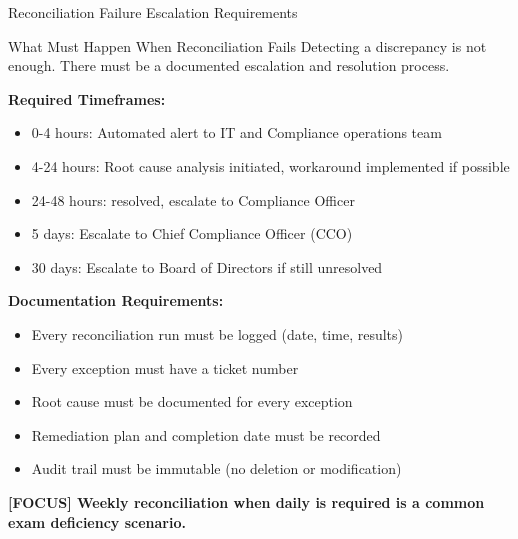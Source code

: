 \documentclass[11pt,a4paper]{beamer}
\newcommand{\examfocus}[1]{\textcolor{orange!80!black}{\textbf{[FOCUS] #1}}}
\begin{document}
	\begin{frame}{Reconciliation Failure Escalation Requirements}
		\begin{block}{What Must Happen When Reconciliation Fails}
			Detecting a discrepancy is not enough. There must be a documented escalation and resolution process.
		\end{block}
		
		\textbf{Required Timeframes:}
		\begin{itemize}
			\item 0-4 hours: Automated alert to IT and Compliance operations team
			\item 4-24 hours: Root cause analysis initiated, workaround implemented if possible
			\item 24-48 hours:  resolved, escalate to Compliance Officer
			\item 5 days: Escalate to Chief Compliance Officer (CCO)
			\item 30 days: Escalate to Board of Directors if still unresolved
		\end{itemize}
		
		\textbf{Documentation Requirements:}
		\begin{itemize}
			\item Every reconciliation run must be logged (date, time, results)
			\item Every exception must have a ticket number
			\item Root cause must be documented for every exception
			\item Remediation plan and completion date must be recorded
			\item Audit trail must be immutable (no deletion or modification)
		\end{itemize}
		
		\examfocus{Weekly reconciliation when daily is required is a common exam deficiency scenario.}
	\end{frame}
	
\end{document}
